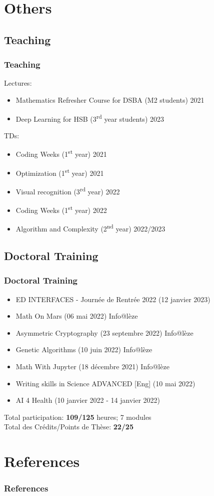 \documentclass{beamer}
\begin{document}
	\section{Others}
	\subsection{Teaching}
	\begin{frame}
		\frametitle{Teaching}
		Lectures:
		\begin{itemize}
			\item Mathematics Refresher Course for DSBA (M2 students) 2021
			\item Deep Learning for HSB (3\textsuperscript{rd} year students) 2023
		\end{itemize}
		\vspace{0.5cm}
		TDs:
		\begin{itemize}
			\item Coding Weeks (1\textsuperscript{st} year) 2021
			\item Optimization (1\textsuperscript{st} year) 2021
			\item Visual recognition (3\textsuperscript{rd} year) 2022
			\item Coding Weeks (1\textsuperscript{st} year) 2022
			\item Algorithm and Complexity (2\textsuperscript{nd} year) 2022/2023
		\end{itemize}
	\end{frame}
	
	\subsection{Doctoral Training}
	\begin{frame}
		\frametitle{Doctoral Training}
		\begin{itemize}
			\item ED INTERFACES - Journée de Rentrée 2022 (12 janvier 2023)
			\item Math On Mars (06 mai 2022) Info@lèze
			\item Asymmetric Cryptography (23 septembre 2022) Info@lèze
			\item Genetic Algorithms (10 juin 2022) Info@lèze
			\item Math With Jupyter (18 décembre 2021) Info@lèze
			\item Writing skills in Science ADVANCED [Eng] (10 mai 2022)
			\item AI 4 Health (10 janvier 2022 - 14 janvier 2022)
		\end{itemize}
		\vspace{0.5cm}
		Total participation: \textbf{109/125} heures; 7 modules\\
		Total des Crédits/Points de Thèse: \textbf{22/25}
	\end{frame}
	
	\section{References}
	\begin{frame}[allowframebreaks]
		\frametitle{References}
		\nocite{*}
		
		
	\end{frame}
\end{document}
